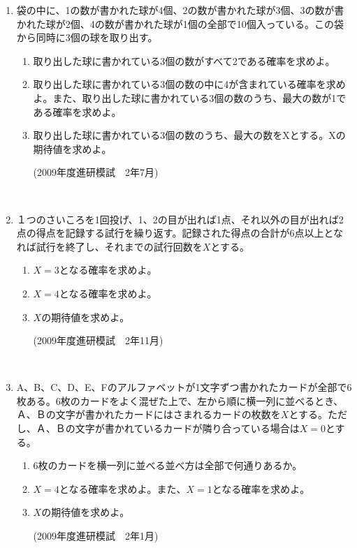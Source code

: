 \documentclass[10pt,a4paper,fleqn]{jsarticle}
\begin{document}
\begin{enumerate}
\item 袋の中に、1の数が書かれた球が4個、2の数が書かれた球が3個、3の数が書かれた球が2個、4の数が書かれた球が1個の全部で10個入っている。この袋から同時に3個の球を取り出す。
\begin{enumerate}[(1)]
\item 取り出した球に書かれている3個の数がすべて2である確率を求めよ。
\item 取り出した球に書かれている3個の数の中に4が含まれている確率を求めよ。また、取り出した球に書かれている3個の数のうち、最大の数が1である確率を求めよ。
\item 取り出した球に書かれている3個の数のうち、最大の数をXとする。Xの期待値を求めよ。
\begin{flushright}
(2009年度進研模試　2年7月)
\end{flushright}
\end{enumerate}\

\item １つのさいころを1回投げ、1、2の目が出れば1点、それ以外の目が出れば2点の得点を記録する試行を繰り返す。記録された得点の合計が6点以上となれば試行を終了し、それまでの試行回数を$X$とする。
\begin{enumerate}[(1)]
\item $X=3$となる確率を求めよ。
\item $X=4$となる確率を求めよ。
\item $X$の期待値を求めよ。
\begin{flushright}
(2009年度進研模試　2年11月)
\end{flushright}
\end{enumerate}\

\item A、B、C、D、E、Fのアルファベットが1文字ずつ書かれたカードが全部で6枚ある。6枚のカードをよく混ぜた上で、左から順に横一列に並べるとき、Ａ、Ｂの文字が書かれたカードにはさまれるカードの枚数を$X$とする。ただし、Ａ、Ｂの文字が書かれているカードが隣り合っている場合は$X=0$とする。
\begin{enumerate}[(1)]
\item 6枚のカードを横一列に並べる並べ方は全部で何通りあるか。
\item $X=4$となる確率を求めよ。また、$X=1$となる確率を求めよ。
\item $X$の期待値を求めよ。
\begin{flushright}
(2009年度進研模試　2年1月)
\end{flushright}
\end{enumerate}\


\end{enumerate}
\end{document}

